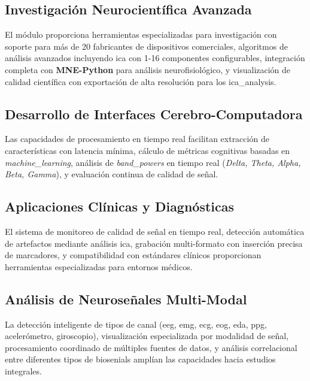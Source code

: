 \subsection{Investigación Neurocientífica Avanzada}
\label{subsec:investigacion_neurocientifica}

El módulo proporciona herramientas especializadas para investigación con soporte para más de 20 fabricantes de dispositivos comerciales, algoritmos de análisis avanzados incluyendo \acrshort{ica} con 1-16 componentes configurables, integración completa con \textbf{MNE-Python} para análisis neurofisiológico, y visualización de calidad científica con exportación de alta resolución para los \gls{ica_analysis}.

\subsection{Desarrollo de Interfaces Cerebro-Computadora}
\label{subsec:desarrollo_bci}

Las capacidades de procesamiento en tiempo real facilitan extracción de características con latencia mínima, cálculo de métricas cognitivas basadas en \textit{\gls{machine_learning}}, análisis de \textit{\gls{band_powers}} en tiempo real (\textit{Delta, Theta, Alpha, Beta, Gamma}), y evaluación continua de calidad de señal.

\subsection{Aplicaciones Clínicas y Diagnósticas}
\label{subsec:aplicaciones_clinicas}

El sistema de monitoreo de calidad de señal en tiempo real, detección automática de \glspl{artefacto} mediante análisis \acrshort{ica}, grabación multi-formato con inserción precisa de marcadores, y compatibilidad con estándares clínicos proporcionan herramientas especializadas para entornos médicos.

\subsection{Análisis de Neuroseñales Multi-Modal}
\label{subsec:analisis_multimodal}

La detección inteligente de tipos de canal (\acrshort{eeg}, \acrshort{emg}, \acrshort{ecg}, \acrshort{eog}, \acrshort{eda}, \acrshort{ppg}, acelerómetro, giroscopio), visualización especializada por modalidad de señal, procesamiento coordinado de múltiples fuentes de datos, y análisis correlacional entre diferentes tipos de \glspl{biosenial} amplían las capacidades hacia estudios integrales.